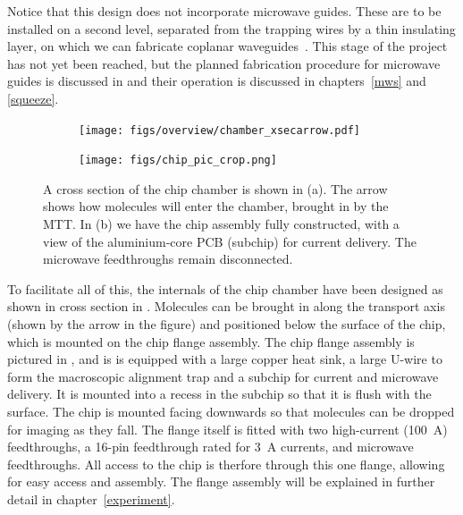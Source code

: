 Notice that this design does not incorporate microwave guides. These are to be
installed on a second level, separated from the trapping wires by a thin
insulating layer, on which we can fabricate coplanar waveguides~\cite{1127105}.
This stage of the project has not yet been reached, but the planned fabrication
procedure for microwave guides is discussed in  and their
operation is discussed in chapters~\ref{mws} and \ref{squeeze}.

\begin{figure}
  \centering
  \begin{subfigure}[b]{0.45\textwidth}
    \texttt{[image: figs/overview/chamber\_xsecarrow.pdf]}
    \caption{}
  \end{subfigure}
  \hspace{1cm}
  \begin{subfigure}[b]{0.45\textwidth}
    \texttt{[image: figs/chip\_pic\_crop.png]}
    \caption{}
  \end{subfigure}
  \caption{
  A cross section of the chip chamber is shown in (a). The arrow shows how
  molecules will enter the chamber, brought in by the MTT.
  In (b) we have the chip assembly fully constructed, with a view of the
    aluminium-core PCB (subchip) for current delivery. The
    microwave feedthroughs remain disconnected.
  }
  \label{overview:fig:chipchamber}
\end{figure}


To facilitate all of this, the internals of the chip chamber have been designed
as shown in cross section in .
Molecules can be brought in along the transport axis (shown by the arrow in the
figure) and positioned below the surface of the chip, which is mounted on the
chip flange assembly. The chip flange assembly is pictured in
, and is is equipped with a large
copper heat sink, a large U-wire to form the macroscopic alignment trap and a
subchip for current and microwave delivery. It is mounted
into a recess in the subchip so that it is flush with the surface. The chip is
mounted facing downwards so that molecules can be dropped for imaging as they
fall. The flange itself is fitted with two high-current (\SI{100}{\ampere})
feedthroughs, a 16-pin feedthrough rated for \SI{3}{\ampere} currents, and
microwave feedthroughs. All access to the chip is therfore through this one
flange, allowing for easy access and assembly. The flange assembly will be
explained in further detail in chapter~\ref{experiment}.
